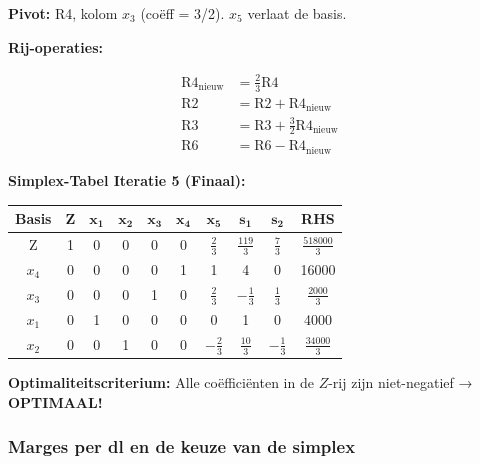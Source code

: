 \documentclass[a4paper,11pt]{article}
\begin{document}
\begin{oefenblok}
    \textbf{Pivot:} R4, kolom $x_3$ (coëff = 3/2). $x_5$ verlaat de basis.

    \textbf{Rij-operaties:}

    \begin{align*}
        \text{R4}_{\text{nieuw}} & = \frac{2}{3}\text{R4} \\
        \text{R2} & = \text{R2} + \text{R4}_{\text{nieuw}} \\
        \text{R3} & = \text{R3} + \frac{3}{2}\text{R4}_{\text{nieuw}} \\
        \text{R6} & = \text{R6} - \text{R4}_{\text{nieuw}}
    \end{align*}

    \textbf{Simplex-Tabel Iteratie 5 (Finaal):}

    \begin{center}
        \footnotesize
        \setlength{\tabcolsep}{3pt}
        \begin{tabular}{|c|c|c|c|c|c|c|c|c|c|}
            \hline
            \textbf{Basis} & \textbf{Z} & $\mathbf{x_1}$ & $\mathbf{x_2}$ & $\mathbf{x_3}$ & $\mathbf{x_4}$ & $\mathbf{x_5}$ & $\mathbf{s_1}$ & $\mathbf{s_2}$ & \textbf{RHS} \\
            \hline
            Z & 1 & 0 & 0 & 0 & 0 & $\frac{2}{3}$ & $\frac{119}{3}$ & $\frac{7}{3}$ & $\frac{518000}{3}$ \\
            \hline
            $x_4$ & 0 & 0 & 0 & 0 & 1 & 1 & 4 & 0 & 16000 \\
            \hline
            $x_3$ & 0 & 0 & 0 & 1 & 0 & $\frac{2}{3}$ & $-\frac{1}{3}$ & $\frac{1}{3}$ & $\frac{2000}{3}$ \\
            \hline
            $x_1$ & 0 & 1 & 0 & 0 & 0 & 0 & 1 & 0 & 4000 \\
            \hline
            $x_2$ & 0 & 0 & 1 & 0 & 0 & $-\frac{2}{3}$ & $\frac{10}{3}$ & $-\frac{1}{3}$ & $\frac{34000}{3}$ \\
            \hline
        \end{tabular}
    \end{center}

    \textbf{Optimaliteitscriterium:} Alle coëfficiënten in de $Z$-rij zijn niet-negatief → \textbf{OPTIMAAL!}

    \subsubsection*{Marges per dl en de keuze van de simplex}


\end{oefenblok}
\end{document}
